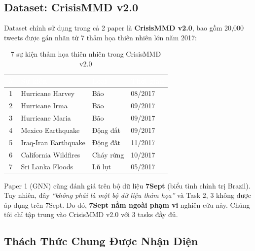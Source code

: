 \documentclass[12pt,a4paper]{article}
\begin{document}
\subsection{Dataset: CrisisMMD v2.0}

Dataset chính sử dụng trong cả 2 paper là \textbf{CrisisMMD v2.0}, bao gồm 20,000 tweets được gán nhãn từ 7 thảm họa thiên nhiên lớn năm 2017:

\begin{table}[H]
\centering
\caption{7 sự kiện thảm họa thiên nhiên trong CrisisMMD v2.0}
\begin{tabular}{clll}
\toprule
\rowcolor{tableheader}
\textcolor{white}{\#} & \textcolor{white}{\textbf{Sự kiện}} & \textcolor{white}{\textbf{Loại}} & \textcolor{white}{\textbf{Thời gian}} \\
\midrule
1 & Hurricane Harvey & Bão & 08/2017 \\
2 & Hurricane Irma & Bão & 09/2017 \\
3 & Hurricane Maria & Bão & 09/2017 \\
4 & Mexico Earthquake & Động đất & 09/2017 \\
5 & Iraq-Iran Earthquake & Động đất & 11/2017 \\
6 & California Wildfires & Cháy rừng & 10/2017 \\
7 & Sri Lanka Floods & Lũ lụt & 05/2017 \\
\bottomrule
\end{tabular}
\end{table}

\begin{warningbox}
Paper 1 (GNN) cũng đánh giá trên bộ dữ liệu \textbf{7Sept} (biểu tình chính trị Brazil). Tuy nhiên, đây \textit{``không phải là một bộ dữ liệu thảm họa''} và Task 2, 3 không được áp dụng trên 7Sept. Do đó, \textbf{7Sept nằm ngoài phạm vi} nghiên cứu này. Chúng tôi chỉ tập trung vào CrisisMMD v2.0 với 3 tasks đầy đủ.
\end{warningbox}

\subsection{Thách Thức Chung Được Nhận Diện}
\end{document}

